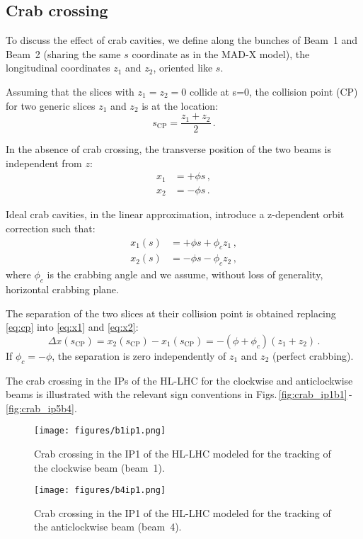 \subsection{Crab crossing}
\label{sec:crab}

To discuss the effect of crab cavities, we define along the bunches of Beam~1 and Beam~2 (sharing the same $s$ coordinate as in the MAD-X model), the longitudinal coordinates $z_1$ and $z_2$, oriented like $s$.

Assuming that the slices with $z_1 = z_2 = 0$ collide at s=0, the collision point (CP) for two generic slices $z_1$ and $z_2$ is at the location:
\begin{equation}
    s_\text{CP} = \frac{z_1 + z_2}{2} \, .
    \label{eq:cp}
\end{equation}

In the absence of crab crossing, the transverse position of the two beams is independent from $z$:
\begin{align}
    x_1 &= +\phi s \, ,\\
    x_2 &= -\phi s \, .
\end{align}

Ideal crab cavities, in the linear approximation, introduce a z-dependent orbit correction such that:
\begin{align}
    x_1(s) &= +\phi s + \phi_c z_1 \label{eq:x1} \, ,\\
    x_2(s) &= -\phi s - \phi_c z_2 \label{eq:x2} \, ,
\end{align}
where $\phi_c$ is the crabbing angle and we assume, without loss of generality, horizontal crabbing plane.

The separation of the two slices at their collision point is obtained replacing \eqref{eq:cp} into \eqref{eq:x1} and \eqref{eq:x2}:
\begin{equation}
    \Delta x(s_\text{CP}) = x_2(s_\text{CP}) - x_1(s_\text{CP}) = 
    - (\phi + \phi_c) (z_1 + z_2)  \, .
\end{equation}
If $\phi_c = -\phi$, the separation is zero independently of $z_1$ and $z_2$ (perfect crabbing).

The crab crossing in the IPs of the HL-LHC for the clockwise and anticlockwise beams is illustrated with the relevant sign conventions in Figs.\,\ref{fig:crab_ip1b1}\,-\,\ref{fig:crab_ip5b4}.

\begin{figure}[p]
\centering
\texttt{[image: figures/b1ip1.png]}
\caption{\small Crab crossing in the IP1 of the HL-LHC modeled for the tracking of the clockwise beam (beam~1).  \label{fig:crab_ip1b1}}
\texttt{[image: figures/b4ip1.png]}
\caption{\small Crab crossing in the IP1 of the HL-LHC modeled for the tracking of the anticlockwise beam (beam~4). \label{fig:crab_ip1b4}}
\end{figure}

